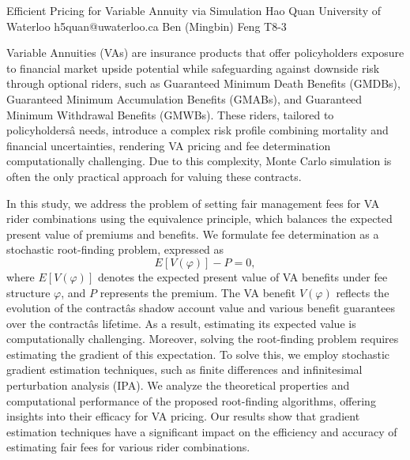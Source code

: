 \begin{talk}
  {Efficient Pricing for Variable Annuity via Simulation}%
  {Hao Quan}%
  {University of Waterloo}%
  {h5quan@uwaterloo.ca}%
  {Ben (Mingbin) Feng}%
  {T8-3}%

Variable Annuities (VAs) are insurance products that offer policyholders exposure to financial market upside potential while safeguarding against downside risk through optional riders, such as Guaranteed Minimum Death Benefits (GMDBs), Guaranteed Minimum Accumulation Benefits (GMABs), and Guaranteed Minimum Withdrawal Benefits (GMWBs). These riders, tailored to policyholdersâ needs, introduce a complex risk profile combining mortality and financial uncertainties, rendering VA pricing and fee determination computationally challenging. Due to this complexity, Monte Carlo simulation is often the only practical approach for valuing these contracts.

In this study, we address the problem of setting fair management fees for VA rider combinations using the equivalence principle, which balances the expected present value of premiums and benefits. We formulate fee determination as a stochastic root-finding problem, expressed as
\[
E[V(\varphi)] - P = 0,
\]
where \( E[V(\varphi)] \) denotes the expected present value of VA benefits under fee structure \( \varphi \), and \( P \) represents the premium. The VA benefit \( V(\varphi) \) reflects the evolution of the contractâs shadow account value and various benefit guarantees over the contractâs lifetime. As a result, estimating its expected value is computationally challenging. Moreover, solving the root-finding problem requires estimating the gradient of this expectation. To solve this, we employ stochastic gradient estimation techniques, such as finite differences and infinitesimal perturbation analysis (IPA). We analyze the theoretical properties and computational performance of the proposed root-finding algorithms, offering insights into their efficacy for VA pricing. Our results show that gradient estimation techniques have a significant impact on the efficiency and accuracy of estimating fair fees for various rider combinations.
\end{talk}

